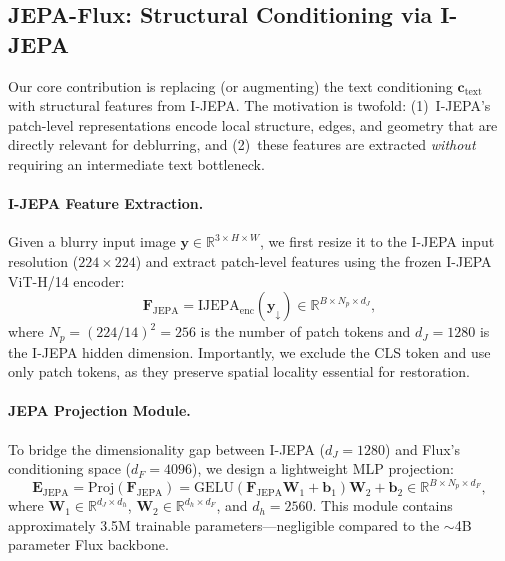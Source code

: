 \documentclass{article}
\begin{document}
\subsection{JEPA-Flux: Structural Conditioning via I-JEPA}

Our core contribution is replacing (or augmenting) the text conditioning $\mathbf{c}_{\text{text}}$ with structural features from I-JEPA. The motivation is twofold: (1)~I-JEPA's patch-level representations encode local structure, edges, and geometry that are directly relevant for deblurring, and (2)~these features are extracted \emph{without} requiring an intermediate text bottleneck.

\paragraph{I-JEPA Feature Extraction.}
Given a blurry input image $\mathbf{y} \in \mathbb{R}^{3 \times H \times W}$, we first resize it to the I-JEPA input resolution ($224 \times 224$) and extract patch-level features using the frozen I-JEPA ViT-H/14 encoder:
\begin{equation}
    \mathbf{F}_{\text{JEPA}} = \text{IJEPA}_{\text{enc}}(\mathbf{y}_{\downarrow}) \in \mathbb{R}^{B \times N_p \times d_J},
    \label{eq:jepa_extract}
\end{equation}
where $N_p = (224/14)^2 = 256$ is the number of patch tokens and $d_J = 1280$ is the I-JEPA hidden dimension. Importantly, we exclude the CLS token and use only patch tokens, as they preserve spatial locality essential for restoration.

\paragraph{JEPA Projection Module.}
To bridge the dimensionality gap between I-JEPA ($d_J = 1280$) and Flux's conditioning space ($d_F = 4096$), we design a lightweight MLP projection:
\begin{equation}
    \mathbf{E}_{\text{JEPA}} = \text{Proj}(\mathbf{F}_{\text{JEPA}}) = \text{GELU}(\mathbf{F}_{\text{JEPA}} \mathbf{W}_1 + \mathbf{b}_1) \mathbf{W}_2 + \mathbf{b}_2 \in \mathbb{R}^{B \times N_p \times d_F},
    \label{eq:projection}
\end{equation}
where $\mathbf{W}_1 \in \mathbb{R}^{d_J \times d_h}$, $\mathbf{W}_2 \in \mathbb{R}^{d_h \times d_F}$, and $d_h = 2560$. This module contains approximately 3.5M trainable parameters---negligible compared to the $\sim$4B parameter Flux backbone.
\end{document}
